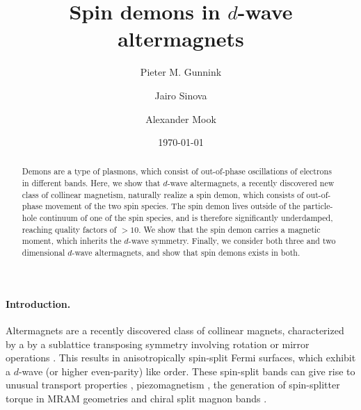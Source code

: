 \documentclass[aps,prl,reprint,twocolumns,superscriptaddress]{revtex4-2}
\begin{document}
	\title{Spin demons in $d$-wave altermagnets}
	\date{\today}
	
	\author{Pieter M. Gunnink}
	\author{Jairo Sinova}
	\author{Alexander Mook}
	\address{Johannes Gutenberg University Mainz, Staudingerweg 7, Mainz 55128, Germany}
	\begin{abstract}
		Demons are a type of plasmons, which consist of out-of-phase oscillations of electrons in different bands. Here, we show that $d$-wave altermagnets, a recently discovered new class of collinear magnetism, naturally realize a spin demon, which consists of out-of-phase movement of the two spin species.
		The spin demon lives outside of the particle-hole continuum of one of the spin species, and is therefore significantly underdamped, reaching quality factors of $>10$. We show that the spin demon carries a magnetic moment, which inherits the $d$-wave symmetry. Finally, we consider both three and two dimensional $d$-wave altermagnets, and show that spin demons exists in both.
	\end{abstract}
	
	\maketitle
	
	
	\paragraph{Introduction.}
	Altermagnets are a recently discovered class of collinear magnets, characterized by a by a sublattice transposing symmetry involving rotation or mirror operations \cite{smejkalConventionalFerromagnetismAntiferromagnetism2022,smejkalEmergingResearchLandscape2022}. This results in anisotropically spin-split Fermi surfaces, which exhibit a  $d$-wave (or higher even-parity) like order. These spin-split bands can give rise to unusual transport properties \cite{smejkalEmergingResearchLandscape2022,zarzuelaTransportTheorySpintransfer2024,liaoSeparationInverseAltermagnetic2024}, piezomagnetism \cite{aoyamaPiezomagneticPropertiesAltermagnetic2024,yershovFluctuationinducedPiezomagnetismLocal2024}, the generation of spin-splitter torque in
	MRAM geometries \cite{karubeObservationSpinSplitterTorque2022} and chiral split magnon bands \cite{nakaSpinCurrentGeneration2019,liuChiralSplitMagnon2024, smejkalChiralMagnonsAltermagnetic2023}.
	
\end{document}
